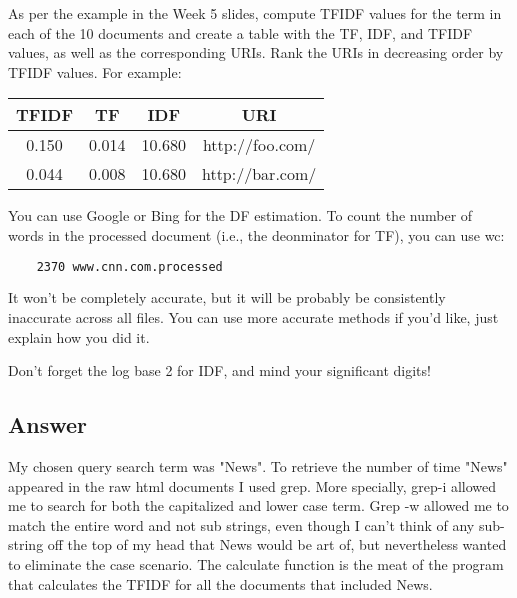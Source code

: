 \documentclass[letterpaper,12pt]{article}
\begin{document}
As per the example in the Week 5 slides, compute TFIDF values for the term in each of the 10 documents and create a table with the TF, IDF, and TFIDF values, as well as the corresponding URIs. Rank the URIs in decreasing order by TFIDF values. For example:

\begin{center}
 \begin{tabular}{||c c c c||} 
 \hline
 TFIDF & TF & IDF & URI \\ [0.5ex] 
 \hline\hline
 0.150 & 0.014 & 10.680 & http://foo.com/ \\ 
 \hline
 0.044 & 0.008 & 10.680 & http://bar.com/ \\
 \hline
\end{tabular}
\end{center}

You can use Google or Bing for the DF estimation. To count the number of words in the processed document (i.e., the deonminator for TF), you can use wc:

\begin{lstlisting}[language=bash,label=Command:, breakatwhitespace=〈false), caption=Command:]
% wc -w www.cnn.com.processed
    2370 www.cnn.com.processed
\end{lstlisting}

It won't be completely accurate, but it will be probably be consistently inaccurate across all files. You can use more accurate methods if you'd like, just explain how you did it.

Don't forget the log base 2 for IDF, and mind your significant digits!

\subsection{Answer}
My chosen query search term was "News". To retrieve the number of time "News" appeared in the raw html documents I used grep. More specially, grep-i allowed me to search for both the capitalized and lower case term. Grep -w allowed me to match the entire word and not sub strings, even though I can't think of any sub-string off the top of my head that News would be art of, but nevertheless wanted to eliminate the case scenario. The calculate function is the meat of the program that calculates the TFIDF for all the documents that included News.  
\vspace{1mm}

\end{document}

